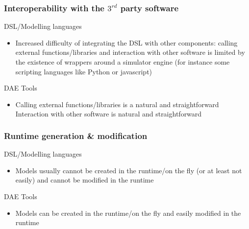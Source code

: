 \documentclass[compress,newPxFont,sthlmFooter]{beamer}
\begin{document}
\begin{frame}
\frametitle{Interoperability with the $3^{rd}$ party software}
\begin{block}{\textcolor{light_red}{DSL/Modelling languages}}
\begin{itemize}
  \item Increased difficulty of integrating the DSL with other components: calling external functions/libraries and interaction with
        other software is limited by the existence of wrappers around a simulator engine (for instance some scripting languages like
        Python or javascript)
\end{itemize}
\end{block}

\begin{block}{\textcolor{light_green}{DAE Tools}}
\begin{itemize}
  \item Calling external functions/libraries is a natural and straightforward Interaction with other software is
        natural and straightforward
\end{itemize}
\end{block}
\end{frame}

\begin{frame}
\frametitle{Runtime generation \& modification}
\begin{block}{\textcolor{light_red}{DSL/Modelling languages}}
\begin{itemize}
  \item Models usually cannot be created in the runtime/on the fly (or at least not easily) 
        and cannot be modified in the runtime
\end{itemize}
\end{block}

\begin{block}{\textcolor{light_green}{DAE Tools}}
\begin{itemize}
  \item Models can be created in the runtime/on the fly and easily modified in the runtime
\end{itemize}
\end{block}
\end{frame}
\end{document}
